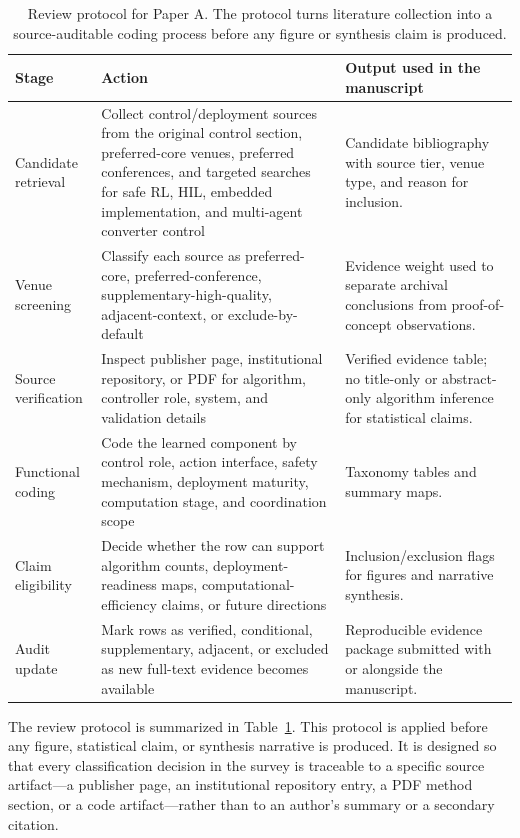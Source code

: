 \documentclass[manuscript,screen,review]{acmart}
\begin{document}
\begin{table}[t]
\caption{Review protocol for Paper A. The protocol turns literature collection into a source-auditable coding process before any figure or synthesis claim is produced.}
\label{tab:review-protocol}
\begin{tabular}{p{}p{}p{}}
\toprule
Stage & Action & Output used in the manuscript \\
\midrule
Candidate retrieval & Collect control/deployment sources from the original control section, preferred-core venues, preferred conferences, and targeted searches for safe RL, HIL, embedded implementation, and multi-agent converter control & Candidate bibliography with source tier, venue type, and reason for inclusion. \\
Venue screening & Classify each source as preferred-core, preferred-conference, supplementary-high-quality, adjacent-context, or exclude-by-default & Evidence weight used to separate archival conclusions from proof-of-concept observations. \\
Source verification & Inspect publisher page, institutional repository, or PDF for algorithm, controller role, system, and validation details & Verified evidence table; no title-only or abstract-only algorithm inference for statistical claims. \\
Functional coding & Code the learned component by control role, action interface, safety mechanism, deployment maturity, computation stage, and coordination scope & Taxonomy tables and summary maps. \\
Claim eligibility & Decide whether the row can support algorithm counts, deployment-readiness maps, computational-efficiency claims, or future directions & Inclusion/exclusion flags for figures and narrative synthesis. \\
Audit update & Mark rows as verified, conditional, supplementary, adjacent, or excluded as new full-text evidence becomes available & Reproducible evidence package submitted with or alongside the manuscript. \\
\bottomrule
\end{tabular}
\end{table}

The review protocol is summarized in Table~\ref{tab:review-protocol}.
This protocol is applied before any figure, statistical claim, or synthesis narrative is produced.
It is designed so that every classification decision in the survey is traceable to a specific source artifact---a publisher page, an institutional repository entry, a PDF method section, or a code artifact---rather than to an author's summary or a secondary citation.
\end{document}
